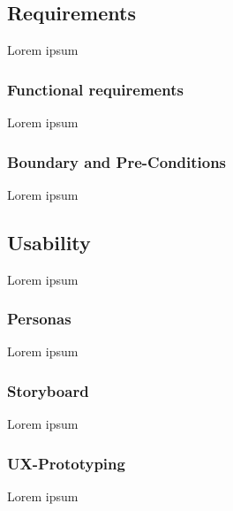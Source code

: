 \subsection{Requirements}
Lorem ipsum

\subsubsection{Functional requirements}
Lorem ipsum

\subsubsection{Boundary and Pre-Conditions}
Lorem ipsum

\subsection{Usability}
Lorem ipsum

\subsubsection{Personas}
Lorem ipsum

\subsubsection{Storyboard}
Lorem ipsum

\subsubsection{UX-Prototyping}
Lorem ipsum